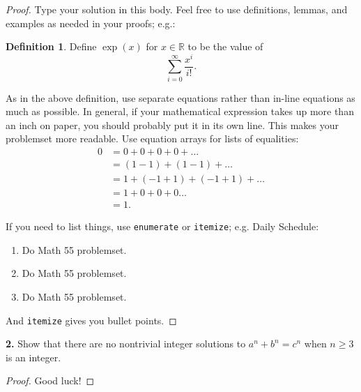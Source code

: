 \documentclass[12pt]{amsart}
\newenvironment{statement}[1]{\smallskip\noindent\color[rgb]{.6627, .3529, .6314} {\bf #1.}}{}
\theoremstyle{definition}
\newtheorem{defn}[theorem]{Definition}
\theoremstyle{remark}
\newcommand{\BR}{\mathbb R}
\begin{document}
\begin{proof}
    Type your solution in this body. Feel free to use definitions, lemmas, and examples as needed in your proofs; e.g.:
    \begin{defn}
        Define $\exp(x)$ for $x \in \BR$ to be the value of $$\sum_{i = 0}^\infty\frac{x^i}{i!}.$$
    \end{defn}
    As in the above definition, use separate equations rather than in-line equations as much as possible. In general, if your mathematical expression takes up more than an inch on paper, you should probably put it in its own line. This makes your problemset more readable. Use equation arrays for lists of equalities:
    \begin{align*}
        0 &= 0 + 0 + 0 + 0 + \dots\\
        &= (1 - 1) + (1 - 1) + \dots \\
        &= 1 + (-1 + 1) + (-1 + 1) + \dots \\
        &= 1 + 0 + 0 + 0 \dots \\
        &= 1.
    \end{align*}

    If you need to list things, use {\tt enumerate} or {\tt itemize}; e.g. Daily Schedule:
    \begin{enumerate}
        \item Do Math 55 problemset.
        \item Do Math 55 problemset.
        \item Do Math 55 problemset.
    \end{enumerate}
    And {\tt itemize} gives you bullet points.
\end{proof}

\begin{statement}{2}
    Show that there are no nontrivial integer solutions to $a^n + b^n = c^n$ when $n\ge 3$ is an integer.
\end{statement}
\begin{proof}
    Good luck!
\end{proof}
\end{document}
